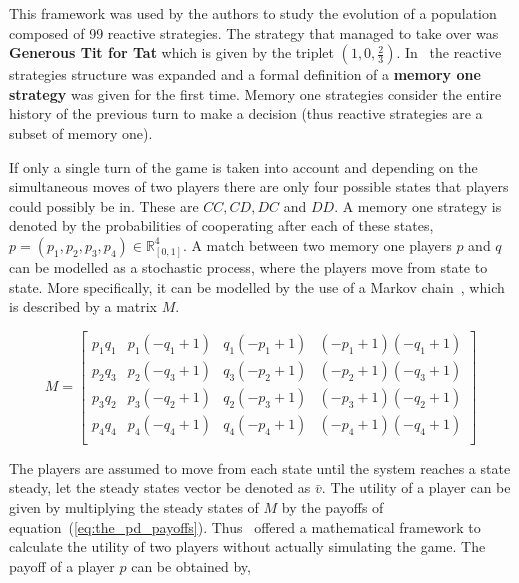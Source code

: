 \documentclass{article}
\theoremstyle{definition}
\begin{document}
This framework was used by the authors to study the evolution of a population
composed of 99 reactive strategies. The strategy that managed to take
over was \textbf{Generous Tit for Tat} which is given by the triplet \((1, 0, \frac{2}{3})\).
In~\cite{Nowak1990} the reactive strategies structure was expanded and a formal definition
of a \textbf{memory one strategy} was given for the first time.
Memory one strategies consider the entire history of
the previous turn to make a decision (thus reactive strategies are a subset of
memory one).

If only a single turn of the game is taken into account and depending on the
simultaneous moves of two players there are only four possible states that
players could possibly be in. These are \(CC, CD, DC\) and \(DD\). A memory one
strategy is denoted by the probabilities of cooperating after each of these states,
\( p = (p_1, p_2, p_3, p_4) \in\mathbb{R}_{[0,1]}^{4} \).
A match between two memory one players \(p\) and \(q\) can be modelled as a
stochastic process, where the players move from state to state. More specifically,
it can be modelled by the use of a Markov chain~\cite{gamerman2006markov},
which is described by a matrix \(M\).

\begin{equation}\label{eq:markov_matrix}
    M =
\begin{bmatrix}
    p_{1} q_{1} & p_{1} (- q_{1} + 1) & q_{1} (- p_{1} + 1) & (- p_{1} + 1) (- q_{1} + 1)
    \\
    p_{2} q_{3} & p_{2} (- q_{3} + 1) & q_{3} (- p_{2} + 1) & (- p_{2} + 1) (- q_{3} + 1)
    \\
    p_{3} q_{2} & p_{3} (- q_{2} + 1) & q_{2} (- p_{3} + 1) & (- p_{3} + 1) (- q_{2} + 1)
    \\
    p_{4} q_{4} & p_{4} (- q_{4} + 1) & q_{4} (- p_{4} + 1) & (- p_{4} + 1) (- q_{4} + 1)
    \\
\end{bmatrix}
\end{equation}

The players are assumed to move from each state until the system reaches a state
steady, let the steady states vector be denoted as \(\bar{v}\).
The utility of a player can be given by multiplying the steady states of
\(M\) by the payoffs of equation~(\ref{eq:the_pd_payoffs}). Thus~\cite{Nowak1990}
offered a mathematical framework to calculate the utility of two players without
actually simulating the game. The payoff of a player \(p\) can be obtained by,
\end{document}
